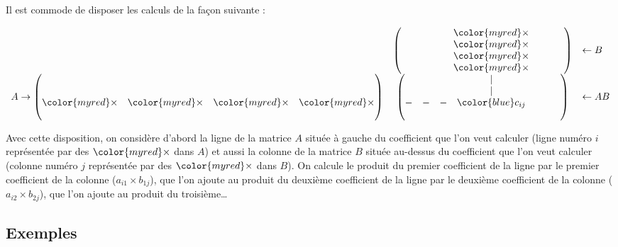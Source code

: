 \documentclass[11pt,class=report,crop=false]{standalone}
\begin{document}
Il est commode de disposer les calculs de la
façon suivante :

$$\begin{array}{ccl}
&\begin{pmatrix}
&&&{\color{myred}\times}&&\\
&&&{\color{myred}\times}&&\\
\hphantom{-}&\hphantom{-}&\hphantom{-}&{\color{myred}\times}&\hphantom{-}&\hphantom{-}\\
&&&{\color{myred}\times}&&
\end{pmatrix}&\leftarrow B\\
A\to\begin{pmatrix}
&&&\\
&&&\\
{\color{myred}\times}&{\color{myred}\times}&{\color{myred}\times}&{\color{myred}\times}\\
&&&
\end{pmatrix}
&\begin{pmatrix}
&&&|&&\\
&&&|&&\\
-&-&-&{\color{blue}c_{ij}}&\hphantom{-}&\hphantom{-}\\
&&&&&
\end{pmatrix}&\leftarrow AB\\
\end{array}
$$


Avec cette disposition, on considère d'abord la ligne
de la matrice $A$ située à gauche du coefficient que l'on veut
calculer (ligne numéro $i$ représentée par des ${\color{myred}\times}$ dans $A$)
et aussi la colonne de la matrice $B$ située au-dessus du coefficient
que l'on veut calculer (colonne numéro $j$ représentée par des ${\color{myred}\times}$ dans $B$).
On calcule le produit du premier coefficient de la ligne par le premier coefficient
de la colonne ($a_{i1} \times b_{1j}$), que l'on ajoute au produit du deuxième coefficient de la ligne par le deuxième coefficient
de la colonne ($a_{i2} \times b_{2j}$), que l'on ajoute au produit du troisième\ldots



\subsection{Exemples}
\end{document}
